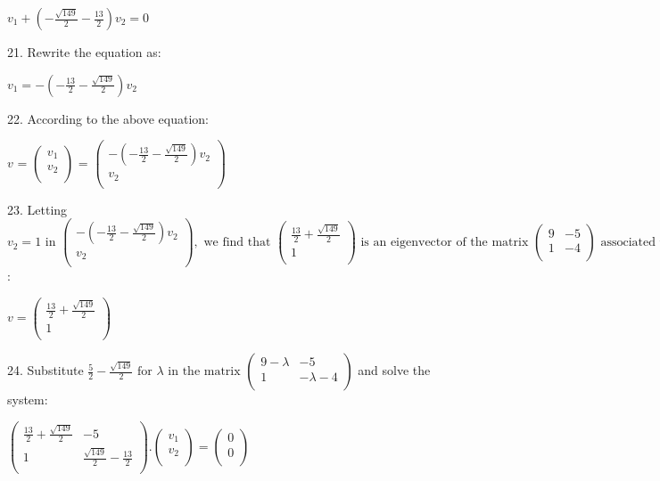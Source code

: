 \documentclass{article}
\begin{document}
$v_1+\left(-\frac{\sqrt{149}}{2}-\frac{13}{2}\right) v_2=0$

21. Rewrite the equation as:

$v_1=-\left(-\frac{13}{2}-\frac{\sqrt{149}}{2}\right) v_2$

22. According to the above equation:

$v\text{ = }\left(
\begin{array}{c}
v_1 \\
 v_2 \\
\end{array}
\right)\text{ = }\left(
\begin{array}{c}
-\left(-\frac{13}{2}-\frac{\sqrt{149}}{2}\right) v_2 \\
 v_2 \\
\end{array}
\right)$

23. Letting $v_2=1\text{ in }\left(
\begin{array}{c}
-\left(-\frac{13}{2}-\frac{\sqrt{149}}{2}\right) v_2 \\
 v_2 \\
\end{array}
\right),\text{ we find that }\left(
\begin{array}{c}
\frac{13}{2}+\frac{\sqrt{149}}{2} \\
 1 \\
\end{array}
\right)\text{ is an eigenvector of the matrix }\left(
\begin{array}{cc}
9 & -5 \\
 1 & -4 \\
\end{array}
\right)\text{ associated with the eigenvalue }\frac{5}{2}+\frac{\sqrt{149}}{2}$:

$v=\left(
\begin{array}{c}
\frac{13}{2}+\frac{\sqrt{149}}{2} \\
 1 \\
\end{array}
\right)$

24. Substitute $\frac{5}{2}-\frac{\sqrt{149}}{2}\text{ for }\lambda\text{  in the matrix }\left(
\begin{array}{cc}
9-\lambda  & -5 \\
 1 & -\lambda -4 \\
\end{array}
\right)$ and solve the system:

$\left(
\begin{array}{cc}
\frac{13}{2}+\frac{\sqrt{149}}{2} & -5 \\
 1 & \frac{\sqrt{149}}{2}-\frac{13}{2} \\
\end{array}
\right).\left(
\begin{array}{c}
v_1 \\
 v_2 \\
\end{array}
\right)=\left(
\begin{array}{c}
0 \\
 0 \\
\end{array}
\right)$
\end{document}
